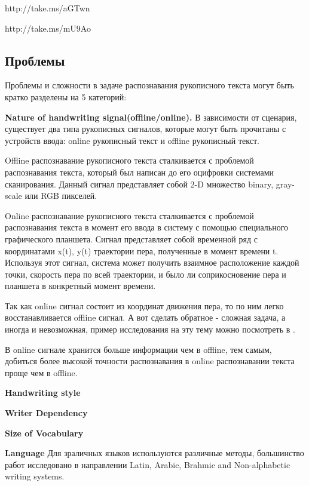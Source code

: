 \cite{tay2001offline}

http://take.ms/aGTwn \cite{plotz2009markov}

http://take.ms/mU9Ao \cite{tay2002offline}

\subsection*{Проблемы}

Проблемы и сложности в задаче распознавания рукописного текста могут быть кратко разделены на 5 категорий:

\textbf{Nature of handwriting signal(offline/online).} В зависимости от сценария, существует два типа рукописных сигналов, которые могут быть прочитаны с  устройств ввода: online рукописный текст и offline рукописный текст.

Offline распознавание рукописного текста сталкивается с проблемой распознавания текста, который был написан до его оцифровки системами сканирования. Данный сигнал представляет собой 2-D множество binary, gray-scale или RGB пикселей.

Online распознавание рукописного текста сталкивается с проблемой распознавания текста в момент его ввода в систему с помощью специального графического планшета. Сигнал представляет собой временной ряд с координатами {x(t), y(t)} траектории пера, полученные в момент времени t. Используя этот сигнал, система может получить взаимное расположение каждой точки, скорость пера по всей траектории, и было ли соприкосновение пера и планшета в конкретный момент времени.

Так как online сигнал состоит из координат движения пера, то по ним легко восстанавливается offline сигнал. А вот сделать обратное - сложная задача, а иногда и невозможная, пример исследования на эту тему можно посмотреть в \cite{поцепаев2004восстановление}. 

В online сигнале хранится больше информации чем в offline, тем самым, добиться более высокой точности распознавания в online распознавании текста проще чем в offline. 

\textbf{Handwriting style}

\textbf{Writer Dependency}

\textbf{Size of Vocabulary}

\textbf{Language} Для зраличных языков используются различные методы, большинство работ исследовано в направлении Latin, Arabic, Brahmic and Non-alphabetic writing systems.


